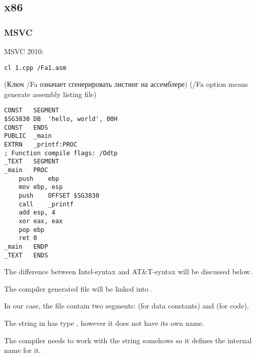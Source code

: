﻿\subsection{x86}

\subsubsection{MSVC}

 MSVC 2010:

\begin{lstlisting}
cl 1.cpp /Fa1.asm
\end{lstlisting}

\IFRU
{(Ключ /Fa означает сгенерировать листинг на ассемблере)}
{(/Fa option means generate assembly listing file)}

\begin{lstlisting}[caption=MSVC 2010]
CONST	SEGMENT
$SG3830	DB	'hello, world', 00H
CONST	ENDS
PUBLIC	_main
EXTRN	_printf:PROC
; Function compile flags: /Odtp
_TEXT	SEGMENT
_main	PROC
	push	ebp
	mov	ebp, esp
	push	OFFSET $SG3830
	call	_printf
	add	esp, 4
	xor	eax, eax
	pop	ebp
	ret	0
_main	ENDP
_TEXT	ENDS
\end{lstlisting}

{The difference between Intel-syntax and AT\&T-syntax will be discussed below.}

{The compiler generated  file will be linked into .}

{In our case, the file contain two segments:  (for data constants) and  (for code).} 

{The string  in \CCpp has type , however it does not have
its own name.}

{The compiler needs to work with the string somehows so it defines the internal name  for it.}

